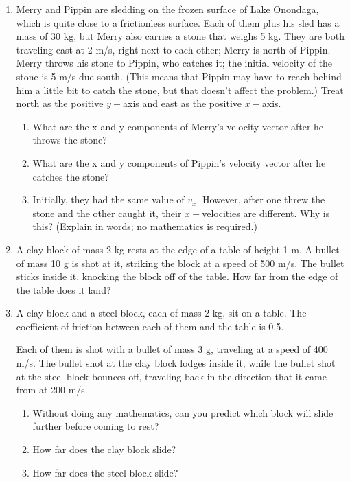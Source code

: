 \documentclass[12pt]{article}
\begin{document}
\begin{enumerate}
\item{

Merry and Pippin are sledding on the frozen surface of Lake Onondaga, which is quite close to a frictionless surface. Each of them plus his sled has a mass of 30 kg, but Merry also carries a stone that weighs 5 kg.
They are both traveling east at 2 m/s, right next to each other; Merry is north of Pippin. Merry throws his stone to Pippin, who catches it; the initial velocity of the stone is 5 m/s due south. (This means that Pippin may have to reach behind him a little bit to catch the stone, but that doesn't affect the problem.) Treat north as the positive $y-$axis and east as the
positive $x-$axis.

\begin{enumerate}
\item{What are the x and y components of Merry's velocity vector after he throws the stone?}
\item{What are the x and y components of Pippin's velocity vector after he catches the stone?}
\item{Initially, they had the same value of $v_x$. However, after one threw the stone and the other caught it, their $x-$velocities are different. Why is this? (Explain in words; no mathematics is required.)}
\end{enumerate}
}

\item{A clay block of mass 2 kg rests at the edge of a table of height 1 m. A bullet of mass 10 g is shot at it, 
striking the block at a speed of 500 m/s. The bullet sticks inside it, knocking the block off of the table. How far from the
edge of the table does it land?}


\item{A clay block and a steel block, each of mass 2 kg, sit on a table. The coefficient of friction between each of them and the table is 0.5.

Each of them is shot with a bullet of mass 3 g, traveling at a speed of 400 m/s. The bullet shot at the clay block lodges inside it, while the bullet 
shot at the steel block bounces off, traveling back in the direction that it came from at 200 m/s. 

\begin{enumerate}
\item{Without doing any mathematics, can you predict which block will slide further before coming to rest?}
\item{How far does the clay block slide?}
\item{How far does the steel block slide?}
\end{enumerate}
}


\end{enumerate}
\end{document}
